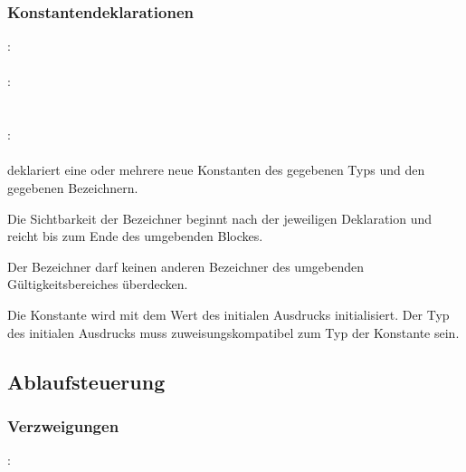 \subsubsection{Konstantendeklarationen}\label{Konstantendeklarationen}
:\label{dekl_konst}\\
\hspace*{1cm}\glq{}\grq  {}   \\
:\label{dekl_konst_bzch_init_liste}\\
\hspace*{1cm} \\
\hspace*{1cm} \glq\Gt{,}\grq  {} \\
:\label{dekl_konst_bzch_init}\\
\hspace*{1cm}  \glq\Gt{=}\grq  {} \\

 deklariert eine oder mehrere neue Konstanten des gegebenen Typs und den gegebenen Bezeichnern.

Die Sichtbarkeit der Bezeichner beginnt nach der jeweiligen Deklaration
und reicht bis zum Ende des umgebenden Blockes.

Der Bezeichner darf keinen anderen Bezeichner des umgebenden Gültigkeitsbereiches überdecken.

Die Konstante wird mit dem Wert des initialen Ausdrucks initialisiert.
Der Typ des initialen Ausdrucks muss zuweisungskompatibel zum Typ der Konstante sein.

\subsection{Ablaufsteuerung}\label{Ablaufsteuerung}
\subsubsection{Verzweigungen}\label{Verzweigungen}
:\label{verzweigung}\\
\hspace*{1cm}\glq{}\grq  \glq\Gt{(}\grq  {}  \glq\Gt{)}\grq  \glq\Gt{\{}\grq  {}  \glq\Gt{\}}\grq \\
\hspace*{1cm}\glq{}\grq  \glq\Gt{(}\grq  {}  \glq\Gt{)}\grq  \glq\Gt{\{}\grq  {}  \glq\Gt{\}}\grq \glq{}\grq  \glq\Gt{\{}\grq  {}  \glq\Gt{\}}\grq \\

